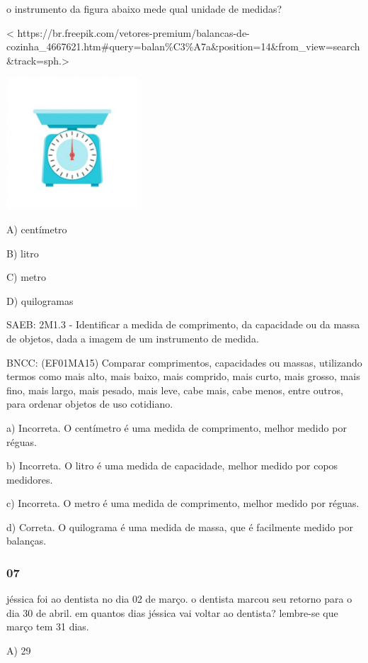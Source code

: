 o instrumento da figura abaixo mede qual unidade de medidas?

\textless{}
https://br.freepik.com/vetores-premium/balancas-de-cozinha\_4667621.htm\#query=balan\%C3\%A7a\&position=14\&from\_view=search\&track=sph.\textgreater{}

\includegraphics[width=1.93750in,height=1.93750in]{media/image114.jpg}

A) centímetro

B) litro

C) metro

D) quilogramas

SAEB: 2M1.3 - Identificar a medida de comprimento, da capacidade ou da
massa de objetos, dada a imagem de um instrumento de medida.

BNCC: (EF01MA15) Comparar comprimentos, capacidades ou massas,
utilizando termos como mais alto, mais baixo, mais comprido, mais curto,
mais grosso, mais fino, mais largo, mais pesado, mais leve, cabe mais,
cabe menos, entre outros, para ordenar objetos de uso cotidiano.

a) Incorreta. O centímetro é uma medida de comprimento, melhor medido
por réguas.

b) Incorreta. O litro é uma medida de capacidade, melhor medido por
copos medidores.

c) Incorreta. O metro é uma medida de comprimento, melhor medido por
réguas.

d) Correta. O quilograma é uma medida de massa, que é facilmente medido
por balanças.

\subsubsection{07}\label{section-108}

jéssica foi ao dentista no dia 02 de março. o dentista marcou seu
retorno para o dia 30 de abril. em quantos dias jéssica vai voltar ao
dentista? lembre-se que março tem 31 dias.

A) 29

